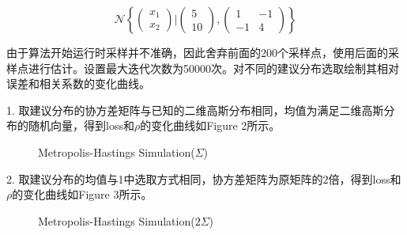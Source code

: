\documentclass[twocolumn]{article}
\begin{document}
$$\mathcal{N}\left\{
\begin{pmatrix}
x_1 \\
x_2
\end{pmatrix}|
\begin{pmatrix}
5 \\
10
\end{pmatrix},
\begin{pmatrix}
1 & -1 \\
-1 & 4
\end{pmatrix}
\right\} $$

由于算法开始运行时采样并不准确，因此舍弃前面的200个采样点，使用后面的采样点进行估计。设置最大迭代次数为50000次。对不同的建议分布选取绘制其相对误差和相关系数的变化曲线。

1. 取建议分布的协方差矩阵与已知的二维高斯分布相同，均值为满足二维高斯分布的随机向量，得到loss和$\rho$的变化曲线如Figure 2所示。

\begin{figure}[H]
  \centering
  \hspace{0in}
  \caption{Metropolis-Hastings Simulation($\Sigma$)}
\end{figure}

2. 取建议分布的均值与1中选取方式相同，协方差矩阵为原矩阵的2倍，得到loss和$\rho$的变化曲线如Figure 3所示。

\begin{figure}[H]
  \centering
  \hspace{0in}
  \caption{Metropolis-Hastings Simulation($2\Sigma$)}
\end{figure}
\end{document}

